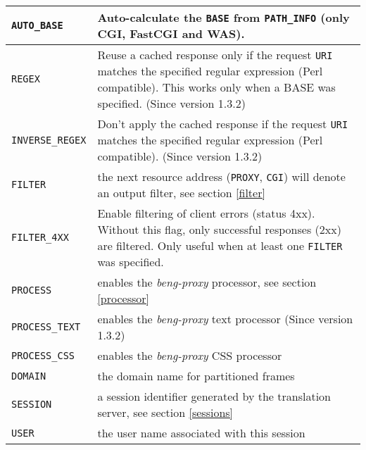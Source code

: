 \documentclass[a4paper,12pt]{article}
\begin{document}
\begin{longtable}{|l|p{8cm}|}
\verb|AUTO_BASE| & Auto-calculate the \verb|BASE| from
\verb|PATH_INFO| (only CGI, FastCGI and WAS). \\

\hline

\verb|REGEX| & Reuse a cached response only if the request \verb|URI|
matches the specified regular expression (Perl compatible).  This
works only when a BASE was specified.
\scriptsize{(Since version 1.3.2)} \\

\hline

\verb|INVERSE_REGEX| & Don't apply the cached response if the request
\verb|URI| matches the specified regular expression (Perl
compatible). \scriptsize{(Since version 1.3.2)} \\

\hline

\verb|FILTER| & the next resource address (\verb|PROXY|,
\verb|CGI|) will denote an output filter, see section \ref{filter}
\\

\hline

\verb|FILTER_4XX| & Enable filtering of client errors (status 4xx).
Without this flag, only successful responses (2xx) are filtered.  Only
useful when at least one \verb|FILTER| was specified. \\

\hline

\verb|PROCESS| & enables the \emph{beng-proxy} processor, see
section \ref{processor} \\

\hline

\verb|PROCESS_TEXT| & enables the \emph{beng-proxy} text processor
\scriptsize{(Since version 1.3.2)} \\

\hline

\verb|PROCESS_CSS| & enables the \emph{beng-proxy} CSS processor \\

\hline

\verb|DOMAIN| & the domain name for partitioned frames \\

\hline

\verb|SESSION| & a session identifier generated by the translation
server, see section \ref{sessions} \\

\hline

\verb|USER| & the user name associated with this session \\


\end{longtable}
\end{document}
